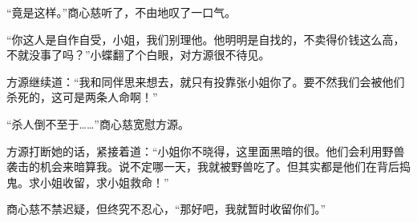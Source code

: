 \begin{this_body}
“竟是这样。”商心慈听了，不由地叹了一口气。

“你这人是自作自受，小姐，我们别理他。他明明是自找的，不卖得价钱这么高，不就没事了吗？”小蝶翻了个白眼，对方源很不待见。

方源继续道：“我和同伴思来想去，就只有投靠张小姐你了。要不然我们会被他们杀死的，这可是两条人命啊！”

“杀人倒不至于……”商心慈宽慰方源。

方源打断她的话，紧接着道：“小姐你不晓得，这里面黑暗的很。他们会利用野兽袭击的机会来暗算我。说不定哪一天，我就被野兽吃了。但其实都是他们在背后捣鬼。求小姐收留，求小姐救命！”

商心慈不禁迟疑，但终究不忍心，“那好吧，我就暂时收留你们。”

\end{this_body}

